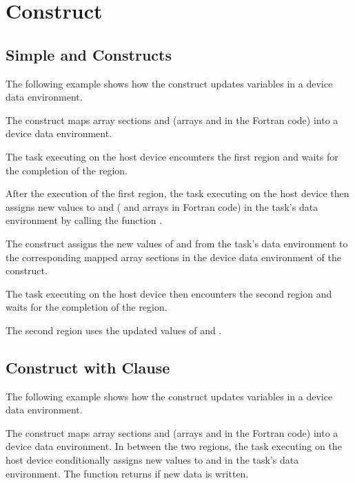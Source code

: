 \pagebreak
\chapter{  Construct}
\label{chap:target_update}

\section{Simple   and   Constructs}

The following example shows how the   construct updates 
variables in a device data environment.

The   construct maps array sections  and  
(arrays  and  in the Fortran code) into a device data environment.

The task executing on the host device encounters the first  region 
and waits for the completion of the region.

After the execution of the first  region, the task executing on 
the host device then assigns new values to  and  ( and  arrays 
in Fortran code) in the task's data environment by calling the function .

The   construct assigns the new values of  and 
 from the task's data environment to the corresponding mapped array sections 
in the device data environment of the   construct.

The task executing on the host device then encounters the second  
region and waits for the completion of the region.

The second  region uses the updated values of  and .



\section{  Construct with  Clause}

The following example shows how the   construct updates 
variables in a device data environment.

The   construct maps array sections  and  
(arrays  and  in the Fortran code) into a device data environment. In between 
the two  regions, the task executing on the host device conditionally 
assigns new values to  and  in the task's data environment. The function  
returns  if new data is written.

